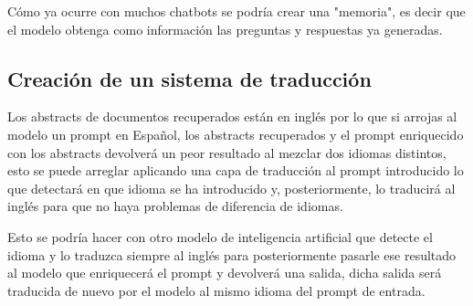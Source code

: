 Cómo ya ocurre con muchos chatbots se podría crear una "memoria", es decir que el modelo obtenga como información las preguntas y respuestas ya generadas.

\subsection{Creación de un sistema de traducción}

Los abstracts de documentos recuperados están en inglés por lo que si arrojas al modelo un prompt en Español, los abstracts recuperados y el prompt enriquecido con los abstracts devolverá un peor resultado al mezclar dos idiomas distintos, esto se puede arreglar aplicando una capa de traducción al prompt introducido lo que detectará en que idioma se ha introducido y, posteriormente, lo traducirá al inglés para que no haya problemas de diferencia de idiomas. 

Esto se podría hacer con otro modelo de inteligencia artificial que detecte el idioma y lo traduzca siempre al inglés para posteriormente pasarle ese resultado al modelo que enriquecerá el prompt y devolverá una salida, dicha salida será traducida de nuevo por el modelo al mismo idioma del prompt de entrada.
